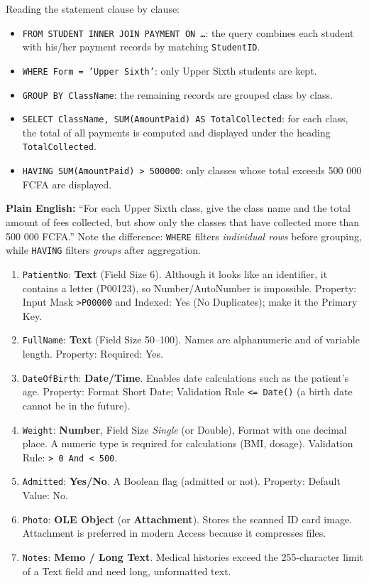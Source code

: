 \documentclass[11pt]{article}
\begin{document}
\begin{corrige}
Reading the statement clause by clause:
\begin{itemize}
\item \texttt{FROM STUDENT INNER JOIN PAYMENT ON \dots}: the query combines each student with his/her payment records by matching \texttt{StudentID}.
\item \texttt{WHERE Form = 'Upper Sixth'}: only Upper Sixth students are kept.
\item \texttt{GROUP BY ClassName}: the remaining records are grouped class by class.
\item \texttt{SELECT ClassName, SUM(AmountPaid) AS TotalCollected}: for each class, the total of all payments is computed and displayed under the heading \texttt{TotalCollected}.
\item \texttt{HAVING SUM(AmountPaid) > 500000}: only classes whose total exceeds 500 000 FCFA are displayed.
\end{itemize}
\textbf{Plain English:} ``For each Upper Sixth class, give the class name and the total amount of fees collected, but show only the classes that have collected more than 500 000 FCFA.'' Note the difference: \texttt{WHERE} filters \emph{individual rows} before grouping, while \texttt{HAVING} filters \emph{groups} after aggregation.
\end{corrige}

\begin{corrige}
\begin{enumerate}
\item \texttt{PatientNo}: \textbf{Text} (Field Size 6). Although it looks like an identifier, it contains a letter (P00123), so Number/AutoNumber is impossible. Property: Input Mask \texttt{>P00000} and Indexed: Yes (No Duplicates); make it the Primary Key.
\item \texttt{FullName}: \textbf{Text} (Field Size 50--100). Names are alphanumeric and of variable length. Property: Required: Yes.
\item \texttt{DateOfBirth}: \textbf{Date/Time}. Enables date calculations such as the patient's age. Property: Format Short Date; Validation Rule \texttt{<= Date()} (a birth date cannot be in the future).
\item \texttt{Weight}: \textbf{Number}, Field Size \emph{Single} (or Double), Format with one decimal place. A numeric type is required for calculations (BMI, dosage). Validation Rule: \texttt{> 0 And < 500}.
\item \texttt{Admitted}: \textbf{Yes/No}. A Boolean flag (admitted or not). Property: Default Value: No.
\item \texttt{Photo}: \textbf{OLE Object} (or \textbf{Attachment}). Stores the scanned ID card image. Attachment is preferred in modern Access because it compresses files.
\item \texttt{Notes}: \textbf{Memo / Long Text}. Medical histories exceed the 255-character limit of a Text field and need long, unformatted text.
\end{enumerate}
\end{corrige}
\end{document}
